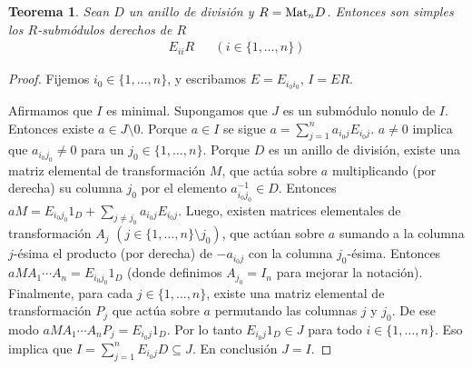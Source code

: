 \documentclass{report}
\newcommand{\Mat}{\textnormal{Mat}}
\newtheorem{theorem}{Teorema}
\begin{document}
  \begin{theorem}
    Sean \(D\) un anillo de división y \(R = \Mat_n D\).
    Entonces son simples los \(R\)-submódulos derechos de \(R\)
    \begin{align}
      E_{i i} R
      &&(i \in \{1, \dots, n\})
    \end{align}
  \end{theorem}
  \begin{proof}
    Fijemos \(i_0 \in \{1, \dots, n\}\), y escribamos \(E = E_{i_0 i_0}\), \(I = E R\).

    Afirmamos que \(I\) es minimal.
    Supongamos que \(J\) es un submódulo nonulo de \(I\).
    Entonces existe \(a \in J \setminus 0\).
    Porque \(a \in I\) se sigue \(a = \sum_{j = 1}^n a_{i_0 j} E_{i_0 j}\).
    \(a \neq 0\) implica que \(a_{i_0 j_0} \neq 0\) para un \(j_0 \in \{1, \dots, n\}\).
    Porque \(D\) es un anillo de división, existe una matriz elemental de transformación \(M\), que actúa sobre \(a\) multiplicando (por derecha) su columna \(j_0\) por el elemento \(a_{i_0 j_0}^{- 1} \in D\).
    Entonces \(a M = E_{i_0 j_0} 1_D + \sum_{j \neq j_0} a_{i_0 j} E_{i_0 j}\).
    Luego, existen matrices elementales de transformación \(A_j\) \((j \in \{1, \dots, n\} \setminus j_0)\), que actúan sobre \(a\) sumando a la columna \(j\)-ésima el producto (por derecha) de \(- a_{i_0 j}\) con la columna \(j_0\)-ésima.
    Entonces \(a M A_1 \cdots A_n = E_{i_0 j_0} 1_D\) (donde definimos \(A_{j_0} = I_n\) para mejorar la notación).
    Finalmente, para cada \(j \in \{1, \dots, n\}\), existe una matriz elemental de transformación \(P_j\) que actúa sobre \(a\) permutando las columnas \(j\) y \(j_0\).
    De ese modo \(a M A_1 \cdots A_n P_j = E_{i_0 j} 1_D\).
    Por lo tanto \(E_{i_0 j} 1_D \in J\) para todo \(i \in \{1, \dots, n\}\).
    Eso implica que \(I = \sum_{j = 1}^n E_{i_0 j} D \subseteq J\).
    En conclusión \(J = I\).
  \end{proof}
\end{document}
